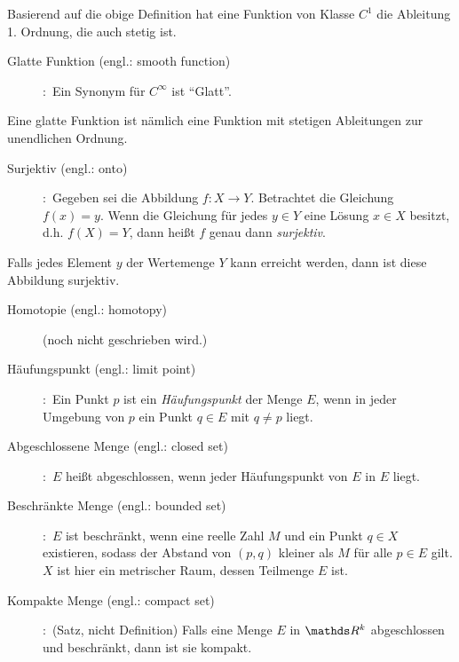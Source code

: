 \vspace{-0.8em}
Basierend auf die obige Definition hat eine Funktion von Klasse $C^{1}$ die Ableitung 1. Ordnung, die auch stetig ist.
\begin{description}
\item[Glatte Funktion (engl.: smooth function)]
\cite[S.5]{tu2010introduction}:~Ein Synonym für $C^{\infty}$ ist ``Glatt''.
\end{description}
\vspace{-0.8em}
Eine glatte Funktion ist nämlich eine Funktion mit stetigen Ableitungen zur unendlichen Ordnung.
\begin{description}
\item[Surjektiv (engl.: onto)]
\cite[S.931]{grosche2003teubner}:~Gegeben sei die Abbildung $f:X \to Y$. Betrachtet die Gleichung $f\left ( x \right )=y$. Wenn die Gleichung für jedes $y\in Y$ eine Lösung $x\in X$ besitzt, d.h. $f\left ( X \right )=Y$, dann heißt $f$ genau dann \emph{surjektiv}.
\end{description}
\vspace{-0.8em}
Falls jedes Element $y$ der Wertemenge $Y$ kann erreicht werden, dann ist diese Abbildung surjektiv. 
\begin{description}
\item[Homotopie (engl.: homotopy)]
\cite[]{}(noch nicht geschrieben wird.)
\end{description}
\vspace{-0.8em}
\begin{description}
\item[Häufungspunkt (engl.: limit point)]
\cite[S.35]{rudin2009analysis}:~Ein Punkt $p$ ist ein \emph{Häufungspunkt} der Menge $E$, wenn in jeder Umgebung von $p$ ein Punkt $q\in E$ mit $q\neq p$ liegt.
\item[Abgeschlossene Menge (engl.: closed set)]
\cite[S.36]{rudin2009analysis}:~$E$ heißt abgeschlossen, wenn jeder Häufungspunkt von $E$ in $E$ liegt.
\item[Beschränkte Menge (engl.: bounded set)]
\cite[S.36]{rudin2009analysis}:~$E$ ist beschränkt, wenn eine reelle Zahl $M$ und ein Punkt $q\in X$ existieren, sodass der Abstand von $(p,q)$ kleiner als $M$ für alle $p\in E$ gilt. $X$ ist hier ein metrischer Raum, dessen Teilmenge $E$ ist.
\item[Kompakte Menge (engl.: compact set)]
\cite[S.45]{rudin2009analysis}:~(Satz, nicht Definition) Falls eine Menge $E$ in $\Reals^{k}$ abgeschlossen und beschränkt, dann ist sie kompakt.
\end{description}
